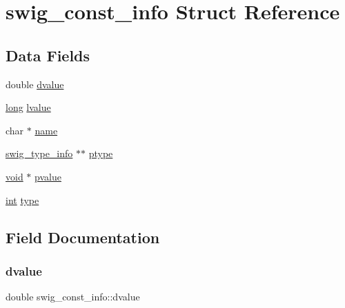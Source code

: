 \hypertarget{structswig__const__info}{}\section{swig\+\_\+const\+\_\+info Struct Reference}
\label{structswig__const__info}
\subsection*{Data Fields}
\begin{DoxyCompactItemize}
\item 
double \hyperlink{structswig__const__info_a74e477f1dbf515bcb7e2ef07a1d34c35}{dvalue}
\item 
\hyperlink{lp__lib_8h_ad3500e0f98a49bb08992451a297ce6a6}{long} \hyperlink{structswig__const__info_af142e4c21ad4fe61f6c2624bff034583}{lvalue}
\item 
char $\ast$ \hyperlink{structswig__const__info_aad383d74116313cf9a8532e163368050}{name}
\item 
\hyperlink{structswig__type__info}{swig\+\_\+type\+\_\+info} $\ast$$\ast$ \hyperlink{structswig__const__info_aedd46d173c5b5ed4ee60ad5660233557}{ptype}
\item 
\hyperlink{lp__lib_8h_ac7828c7b2b31d2e11af17bdb6289c5d9}{void} $\ast$ \hyperlink{structswig__const__info_abbc43512c364bff11fac5961c1155090}{pvalue}
\item 
\hyperlink{lp__lib_8h_adeb9ec6400320e4923ac9d836d509ddb}{int} \hyperlink{structswig__const__info_ae8bbc99e1cda11f24e306365cbf33893}{type}
\end{DoxyCompactItemize}


\subsection{Field Documentation}
\mbox{\label{structswig__const__info_a74e477f1dbf515bcb7e2ef07a1d34c35}} 
\subsubsection{\texorpdfstring{dvalue}{dvalue}}
{\footnotesize\ttfamily double swig\+\_\+const\+\_\+info\+::dvalue}

\mbox{\label{structswig__const__info_af142e4c21ad4fe61f6c2624bff034583}} 
